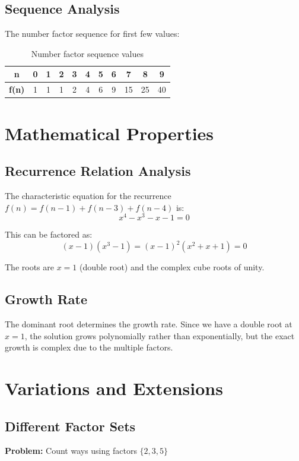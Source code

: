 \documentclass[12pt,a4paper]{article}
\begin{document}
\subsection{Sequence Analysis}

The number factor sequence for first few values:
\begin{table}[h]
\centering
\begin{tabular}{|c|c|c|c|c|c|c|c|c|c|c|}
\hline
\textbf{n} & 0 & 1 & 2 & 3 & 4 & 5 & 6 & 7 & 8 & 9 \\
\hline
\textbf{f(n)} & 1 & 1 & 1 & 2 & 4 & 6 & 9 & 15 & 25 & 40 \\
\hline
\end{tabular}
\caption{Number factor sequence values}
\end{table}

\section{Mathematical Properties}

\subsection{Recurrence Relation Analysis}
The characteristic equation for the recurrence $f(n) = f(n-1) + f(n-3) + f(n-4)$ is:
\begin{equation}
x^4 - x^3 - x - 1 = 0
\end{equation}

This can be factored as:
\begin{equation}
(x-1)(x^3-1) = (x-1)^2(x^2+x+1) = 0
\end{equation}

The roots are $x = 1$ (double root) and the complex cube roots of unity.

\subsection{Growth Rate}
The dominant root determines the growth rate. Since we have a double root at $x = 1$, the solution grows polynomially rather than exponentially, but the exact growth is complex due to the multiple factors.

\section{Variations and Extensions}

\subsection{Different Factor Sets}
\textbf{Problem:} Count ways using factors $\{2, 3, 5\}$
\end{document}
